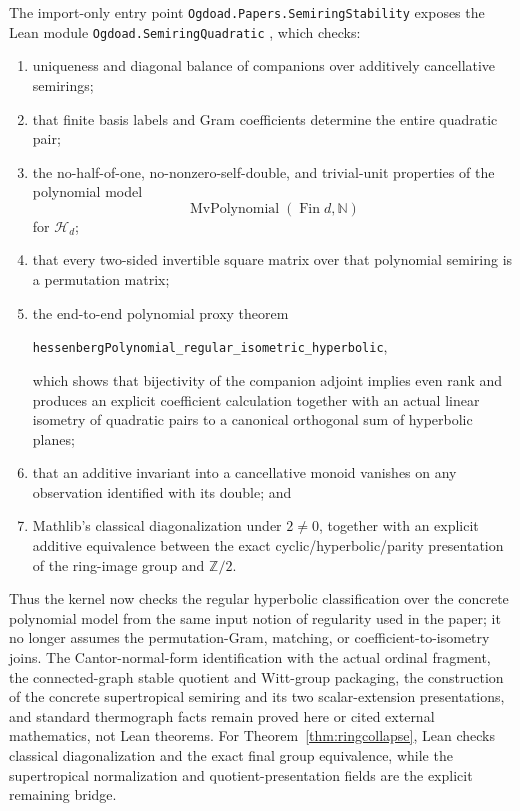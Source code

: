 \documentclass[11pt]{article}
\theoremstyle{definition}
\theoremstyle{remark}
\newcommand{\Nat}{\mathbb N}
\newcommand{\Integers}{\mathbb Z}
\newcommand{\Hess}{\mathcal H}
\begin{document}
The import-only entry point
\texttt{Ogdoad.Papers.}\allowbreak\texttt{SemiringStability} exposes
the Lean module \texttt{Ogdoad.SemiringQuadratic} \cite{ogdoad2026}, which checks:
\begin{enumerate}
\item uniqueness and diagonal balance of companions over additively
cancellative semirings;
\item that finite basis labels and Gram coefficients determine the entire
quadratic pair;
\item the no-half-of-one, no-nonzero-self-double, and trivial-unit properties
of the polynomial model
\[
 \operatorname{MvPolynomial}(\operatorname{Fin}d,\Nat)
\]
for \(\Hess_d\);
\item that every two-sided invertible square matrix over that polynomial
semiring is a permutation matrix;
\item the end-to-end polynomial proxy theorem
\begin{center}
\texttt{hessenbergPolynomial\_regular\_isometric\_hyperbolic},
\end{center}
which shows that bijectivity of the companion adjoint implies even rank and
produces an explicit coefficient calculation together with an actual linear
isometry of quadratic pairs to a canonical orthogonal sum of hyperbolic
planes;
\item that an additive invariant into a cancellative monoid vanishes on any
observation identified with its double; and
\item Mathlib's classical diagonalization under \(2\ne0\), together with an
explicit additive equivalence between the exact cyclic/hyperbolic/parity
presentation of the ring-image group and \(\Integers/2\).
\end{enumerate}
Thus the kernel now checks the regular hyperbolic classification over the
concrete polynomial model from the same input notion of regularity used in the
paper; it no longer assumes the permutation-Gram, matching, or
coefficient-to-isometry joins.  The
Cantor-normal-form identification with the actual ordinal fragment, the
connected-graph stable quotient and Witt-group packaging, the construction of
the concrete supertropical semiring and its two scalar-extension presentations,
and standard thermograph facts remain proved here or cited external
mathematics, not Lean theorems.  For Theorem~\ref{thm:ringcollapse}, Lean
checks classical diagonalization and the exact final group equivalence, while
the supertropical normalization and quotient-presentation fields are the
explicit remaining bridge.
\end{document}
